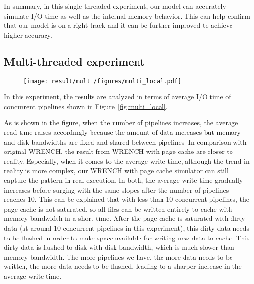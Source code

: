 \documentclass[conference]{IEEEtran}
\begin{document}
			In summary, in this single-threaded experiment, our model can accurately 
			simulate I/O time as well as the internal memory behavior. 
			This can help confirm that our model is on a right track and 
			it can be further improved to achieve higher accuracy.
			
		\subsection{Multi-threaded experiment}
		
			\begin{figure*}		
			\begin{subfigure}{\linewidth}
				\centering
   				\texttt{[image: result/multi/figures/multi\_local.pdf]}
			\end{subfigure}		
			\caption{I/O time with different numbers of concurrent pipeline}
			\label{fig:multi_local}
			\end{figure*}		
			
			In this experiment, the results are analyzed in terms of average I/O time 
			of concurrent pipelines shown in Figure~\ref{fig:multi_local}.
			
			As is shown in the figure, when the number of pipelines increases, 
			the average read time raises accordingly because the amount of data 
			increases but memory and disk bandwidths are fixed and shared between pipelines. 
			In comparison with original WRENCH, the result from WRENCH with page cache are closer 
			to reality. 
			Especially, when it comes to the average write time, 
			although the trend in reality is more complex, our WRENCH with page cache 
			simulator can still capture the pattern in real execution.
			In both, the average write time gradually increases before surging with the 
			same slopes after the number of pipelines reaches 10. 
			This can be explained that with less than 10 concurrent pipelines, 
			the page cache is not saturated, so all files can be written entirely to 
			cache with memory bandwidth in a short time. 
			After the page cache is saturated with dirty data (at around 
			10 concurrent pipelines in this experiment), this dirty data needs 
			to be flushed in order to make space available for writing new data to cache. 
			This dirty data is flushed to disk with disk bandwidth, which is much  
			slower than memory bandwidth. 
			The more pipelines we have, the more data needs to be written, the more data 
			needs to be flushed, leading to a sharper increase in the average write time. 
			
\end{document}
